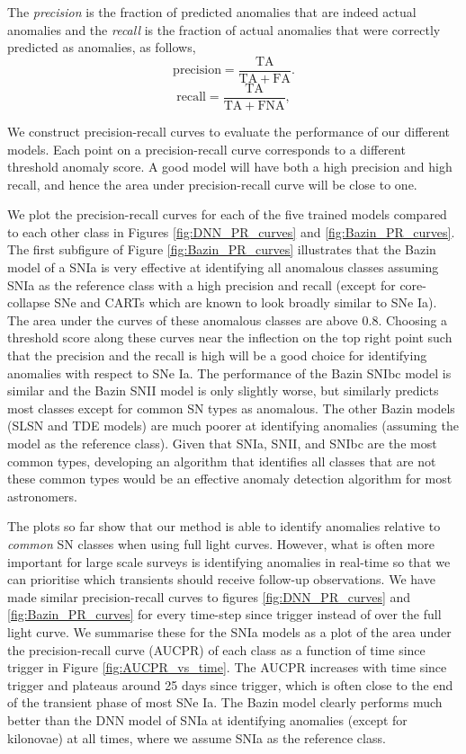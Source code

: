 \documentclass[fleqn,usenatbib]{mnras}
\begin{document}
The \textit{precision} is the fraction of predicted anomalies that are indeed actual anomalies and the \textit{recall} is the fraction of actual anomalies that were correctly predicted as anomalies, as follows,
\begin{equation}
    \mathrm{precision} = \frac{\mathrm{TA}}{\mathrm{TA}+\mathrm{FA}}.
\end{equation}
\begin{equation}
    \mathrm{recall} = \frac{\mathrm{TA}}{\mathrm{TA}+\mathrm{FNA}},
\end{equation}

We construct precision-recall curves to evaluate the performance of our different models. Each point on a precision-recall curve corresponds to a different threshold anomaly score. A good model will have both a high precision and high recall, and hence the area under precision-recall curve will be close to one.

We plot the precision-recall curves for each of the five trained models compared to each other class in Figures \ref{fig:DNN_PR_curves} and \ref{fig:Bazin_PR_curves}. The first subfigure of Figure \ref{fig:Bazin_PR_curves} illustrates that the Bazin model of a SNIa is very effective at identifying all anomalous classes assuming SNIa as the reference class with a high precision and recall (except for core-collapse SNe and CARTs which are known to look broadly similar to SNe Ia). The area under the curves of these anomalous classes are above 0.8. Choosing a threshold score along these curves near the inflection on the top right point such that the precision and the recall is high will be a good choice for identifying anomalies with respect to SNe Ia. The performance of the Bazin SNIbc model is similar and the Bazin SNII model is only slightly worse, but similarly predicts most classes except for common SN types as anomalous. The other Bazin models (SLSN and TDE models) are much poorer at identifying anomalies (assuming the model as the reference class). Given that SNIa, SNII, and SNIbc are the most common types, developing an algorithm that identifies all classes that are not these common types would be an effective anomaly detection algorithm for most astronomers.

The plots so far show that our method is able to identify anomalies relative to \textit{common} SN classes when using full light curves. However, what is often more important for large scale surveys is identifying anomalies in real-time so that we can prioritise which transients should receive follow-up observations. We have made similar precision-recall curves to figures \ref{fig:DNN_PR_curves} and \ref{fig:Bazin_PR_curves} for every time-step since trigger instead of over the full light curve. We summarise these for the SNIa models as a plot of the area under the precision-recall curve (AUCPR) of each class as a function of time since trigger in Figure \ref{fig:AUCPR_vs_time}. The AUCPR increases with time since trigger and plateaus around 25 days since trigger, which is often close to the end of the transient phase of most SNe Ia. The Bazin model clearly performs much better than the DNN model of SNIa at identifying anomalies (except for kilonovae) at all times, where we assume SNIa as the reference class. 
\end{document}
